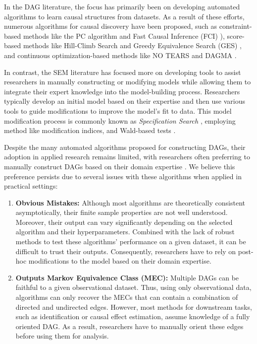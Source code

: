 \documentclass[letterpaper]{article} %
\begin{document}
In the DAG literature, the focus has primarily been on developing automated
algorithms to learn causal structures from datasets. As a result of these
efforts, numerous algorithms for causal discovery have been proposed, such as
constraint-based methods like the PC algorithm \citep{Spirtes2001} and Fast
Causal Inference (FCI) \citep{Spirtes2000}), score-based methods like
Hill-Climb Search and Greedy Equivalence Search (GES) \citep{Chickering2002},
and continuous optimization-based methods like NO TEARS \citep{Zheng2018} and
DAGMA \citep{Bello2022}. 

In contrast, the SEM literature has focused more on developing tools to assist
researchers in manually constructing or modifying models while allowing them to
integrate their expert knowledge into the model-building process. Researchers
typically develop an initial model based on their expertise and then use
various tools to guide modifications to improve the model's fit to data. This
model modification process is commonly known as \emph{Specification Search}
\citep{Long1983}, employing method like modification indices, and Wald-based
tests \citep{Marcoulides2018}.

Despite the many automated algorithms proposed for constructing DAGs, their
adoption in applied research remains limited, with researchers often preferring
to manually construct DAGs based on their domain expertise \citep{Tennant2020,
Petersen2021}. We believe this preference persists due to several issues with
these algorithms when applied in practical settings:

\begin{enumerate}
	\item \textbf{Obvious Mistakes:} Although most algorithms are
		theoretically consistent asymptotically, their finite sample
		properties are not well understood. Moreover, their output can
		vary significantly depending on the selected algorithm and
		their hyperparameters. Combined with the lack of robust methods
		to test these algorithms' performance on a given dataset, it
		can be difficult to trust their outputs. Consequently,
		researchers have to rely on post-hoc modifications to the model
		based on their domain expertise.
	\item \textbf{Outputs Markov Equivalence Class (MEC):} Multiple
		DAGs can be faithful to a given observational dataset. Thus,
		using only observational data, algorithms can only recover the
		MECs that can contain a combination of directed and undirected
		edges. However, most methods for downstream tasks, such as
		identification or causal effect estimation, assume knowledge of
		a fully oriented DAG. As a result, researchers have to manually
		orient these edges before using them for analysis.
\end{enumerate}
\end{document}
